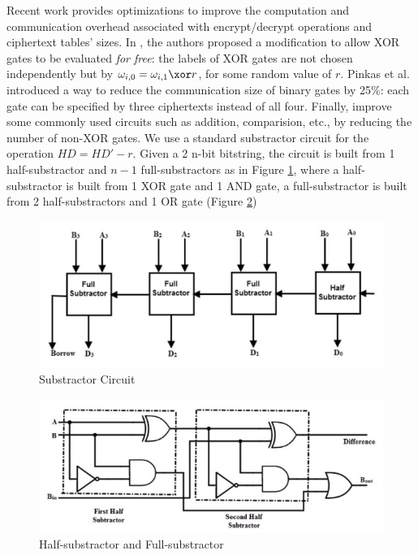 Recent work provides optimizations to improve the computation and communication
overhead associated with encrypt/decrypt operations and ciphertext tables'
sizes. In \cite{kolesnikov2008improved30}, the authors proposed a modification
to allow XOR gates to be evaluated \textit{for free}: the labels of XOR gates
are not chosen independently but by \(\omega_{i,0} = \omega_{i,1} \xor r\), for
some random value of \(r\). Pinkas et al. \cite{pinkas2009secure38} introduced a
way to reduce the communication size of binary gates by 25\%: each gate can be
specified by three ciphertexts instead of all four. Finally,
\cite{kolesnikov2009improved29} improve some commonly used circuits such as
addition, comparision, etc., by reducing the number of non-XOR gates.
We use a standard substractor circuit for the operation \(HD = HD' - r\). Given a 2
n-bit bitstring, the circuit is built from 1 half-substractor and \(n-1\)
full-substractors as in Figure \ref{fig:substractor}, where a half-substractor is built from 1 XOR gate and 1 AND gate, a
full-substractor is built from 2 half-substractors and 1 OR gate (Figure
\ref{fig:fullSubstractor})

\begin{figure}[htbp!] 
  \centering    
  \includegraphics[width=1.0\textwidth]{Chapter7/Figs/Raster/subCircuit}
  \caption{Substractor Circuit}
  \label{fig:substractor}
\end{figure}



\begin{figure}[htbp!] 
  \centering    
  \includegraphics[width=1.0\textwidth]{Chapter7/Figs/Raster/fullSubstractor}
  \caption{Half-substractor and Full-substractor}
  \label{fig:fullSubstractor}
\end{figure}

